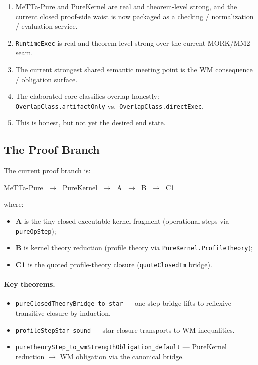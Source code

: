 \documentclass[11pt]{article}
\theoremstyle{remark}
\newcommand{\MeTTa}{\textup{MeTTa}}
\newcommand{\MORK}{\textup{MORK}}
\newcommand{\code}[1]{\texttt{#1}}
\newcommand{\leanref}[1]{\texttt{#1}}
\begin{document}
\begin{enumerate}
  \item \MeTTa-Pure and PureKernel are real and theorem-level strong, and the
  current closed proof-side waist is now packaged as a checking /
  normalization / evaluation service.
  \item \code{RuntimeExec} is real and theorem-level strong over the current
  \MORK{}/MM2 seam.
  \item The current strongest shared semantic meeting point is the WM
  consequence / obligation surface.
  \item The elaborated core classifies overlap honestly:\\
  \leanref{OverlapClass.artifactOnly} vs.\
  \leanref{OverlapClass.directExec}.
  \item This is honest, but not yet the desired end state.
\end{enumerate}

\subsection{The Proof Branch}
\label{sec:proof-branch}

The current proof branch is:

\begin{center}
\MeTTa-Pure $\;\to\;$ PureKernel $\;\to\;$ A $\;\to\;$ B $\;\to\;$ C1
\end{center}

\noindent
where:

\begin{itemize}
  \item \textbf{A} is the tiny closed executable kernel fragment
  (operational steps via \leanref{pureOpStep});
  \item \textbf{B} is kernel theory reduction
  (profile theory via \leanref{PureKernel.ProfileTheory});
  \item \textbf{C1} is the quoted profile-theory closure
  (\leanref{quoteClosed\-Tm} bridge).
\end{itemize}

\paragraph{Key theorems.}
\begin{itemize}
  \item \leanref{pureClosedTheoryBridge\_to\_star} --- one-step bridge lifts
  to reflexive-transitive closure by induction.
  \item \leanref{profileStepStar\_sound} --- star closure transports to WM
  inequalities.
  \item \leanref{pureTheoryStep\_to\_wmStrengthObligation\_default} ---
  PureKernel reduction $\to$ WM obligation via the canonical bridge.
\end{itemize}
\end{document}
